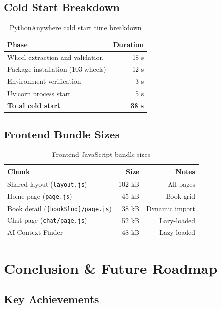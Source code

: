 \documentclass[11pt,a4paper]{article}
\begin{document}
\subsection{Cold Start Breakdown}

\begin{table}[H]
\centering
\begin{tabular}{@{}lr@{}}
\toprule
\textbf{Phase} & \textbf{Duration} \\
\midrule
Wheel extraction and validation & 18 s \\
Package installation (103 wheels) & 12 s \\
Environment verification & 3 s \\
Uvicorn process start & 5 s \\
\textbf{Total cold start} & \textbf{38 s} \\
\bottomrule
\end{tabular}
\caption{PythonAnywhere cold start time breakdown}
\end{table}

\subsection{Frontend Bundle Sizes}

\begin{table}[H]
\centering
\begin{tabular}{@{}lrr@{}}
\toprule
\textbf{Chunk} & \textbf{Size} & \textbf{Notes} \\
\midrule
Shared layout (\texttt{layout.js}) & 102 kB & All pages \\
Home page (\texttt{page.js}) & 45 kB & Book grid \\
Book detail (\texttt{[bookSlug]/page.js}) & 38 kB & Dynamic import \\
Chat page (\texttt{chat/page.js}) & 52 kB & Lazy-loaded \\
AI Context Finder & 48 kB & Lazy-loaded \\
\bottomrule
\end{tabular}
\caption{Frontend JavaScript bundle sizes}
\end{table}
\clearpage

\section{Conclusion \& Future Roadmap}

\subsection{Key Achievements}
 
\end{document}
